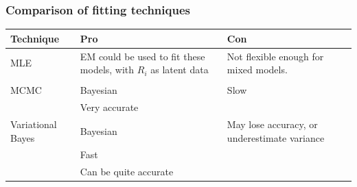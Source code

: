 \documentclass{beamer}
\begin{document}
\begin{frame}
	\frametitle{Comparison of fitting techniques}
	\begin{tabular}{p{2cm}p{3.5cm}p{4.5cm}}
		Technique         & Pro                                                             & Con                                          \\
		\hline
		MLE               & EM could be used to fit these models, with $R_i$ as latent data & Not flexible enough for mixed models.               \\
		                  &                                                                 &                                              \\ %
		\hline
		MCMC              & Bayesian                                                        & Slow                                         \\
		                  & Very accurate                                                   &                                              \\
		\hline
		Variational Bayes & Bayesian                                                        & May lose accuracy, or underestimate variance \\
		                  & Fast                                                            &                                              \\ %
		                  & Can be quite accurate                                            &                                              \\
		\hline
	\end{tabular}
						
\end{frame}
\end{document}
